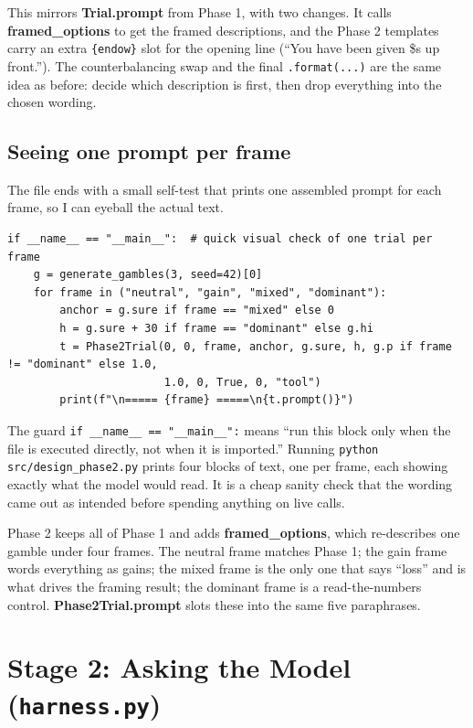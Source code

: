 \documentclass[11pt]{article}
\newcommand{\file}[1]{\textbf{\ttfamily #1}}
\begin{document}
This mirrors \file{Trial.prompt} from Phase 1, with two changes. It calls \file{framed\_options} to
get the framed descriptions, and the Phase 2 templates carry an extra \verb|{endow}| slot for the
opening line (``You have been given \$s up front.''). The counterbalancing swap and the final
\verb|.format(...)| are the same idea as before: decide which description is first, then drop
everything into the chosen wording.

\subsection{Seeing one prompt per frame}

The file ends with a small self-test that prints one assembled prompt for each frame, so I can eyeball
the actual text.

\begin{lstlisting}[style=py,firstnumber=163]
if __name__ == "__main__":  # quick visual check of one trial per frame
    g = generate_gambles(3, seed=42)[0]
    for frame in ("neutral", "gain", "mixed", "dominant"):
        anchor = g.sure if frame == "mixed" else 0
        h = g.sure + 30 if frame == "dominant" else g.hi
        t = Phase2Trial(0, 0, frame, anchor, g.sure, h, g.p if frame != "dominant" else 1.0,
                        1.0, 0, True, 0, "tool")
        print(f"\n===== {frame} =====\n{t.prompt()}")
\end{lstlisting}

The guard \verb|if __name__ == "__main__":| means ``run this block only when the file is executed
directly, not when it is imported.'' Running \verb|python src/design_phase2.py| prints four blocks of
text, one per frame, each showing exactly what the model would read. It is a cheap sanity check that
the wording came out as intended before spending anything on live calls.

\begin{plainbox}
Phase 2 keeps all of Phase 1 and adds \file{framed\_options}, which re-describes one gamble under four
frames. The neutral frame matches Phase 1; the gain frame words everything as gains; the mixed frame
is the only one that says ``loss'' and is what drives the framing result; the dominant frame is a
read-the-numbers control. \file{Phase2Trial.prompt} slots these into the same five paraphrases.
\end{plainbox}

\section{Stage 2: Asking the Model (\texttt{harness.py})}
\end{document}
